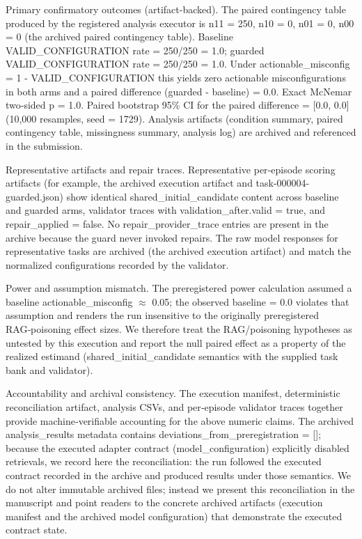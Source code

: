 \documentclass[conference]{IEEEtran}
\begin{document}
Primary confirmatory outcomes (artifact-backed). The paired contingency table produced by the registered analysis executor is n11 = 250, n10 = 0, n01 = 0, n00 = 0 (the archived paired contingency table). Baseline VALID\_CONFIGURATION rate = 250/250 = 1.0; guarded VALID\_CONFIGURATION rate = 250/250 = 1.0. Under actionable\_misconfig = 1 - VALID\_CONFIGURATION this yields zero actionable misconfigurations in both arms and a paired difference (guarded - baseline) = 0.0. Exact McNemar two‑sided p = 1.0. Paired bootstrap 95\% CI for the paired difference = [0.0, 0.0] (10,000 resamples, seed = 1729). Analysis artifacts (condition summary, paired contingency table, missingness summary, analysis log) are archived and referenced in the submission.

Representative artifacts and repair traces. Representative per‑episode scoring artifacts (for example, the archived execution artifact and task-000004-guarded.json) show identical shared\_initial\_candidate content across baseline and guarded arms, validator traces with validation\_after.valid = true, and repair\_applied = false. No repair\_provider\_trace entries are present in the archive because the guard never invoked repairs. The raw model responses for representative tasks are archived (the archived execution artifact) and match the normalized configurations recorded by the validator.

Power and assumption mismatch. The preregistered power calculation assumed a baseline actionable\_misconfig \ensuremath{\approx} 0.05; the observed baseline = 0.0 violates that assumption and renders the run insensitive to the originally preregistered RAG‑poisoning effect sizes. We therefore treat the RAG/poisoning hypotheses as untested by this execution and report the null paired effect as a property of the realized estimand (shared\_initial\_candidate semantics with the supplied task bank and validator).

Accountability and archival consistency. The execution manifest, deterministic reconciliation artifact, analysis CSVs, and per‑episode validator traces together provide machine‑verifiable accounting for the above numeric claims. The archived analysis\_results metadata contains deviations\_from\_preregistration = []; because the executed adapter contract (model\_configuration) explicitly disabled retrievals, we record here the reconciliation: the run followed the executed contract recorded in the archive and produced results under those semantics. We do not alter immutable archived files; instead we present this reconciliation in the manuscript and point readers to the concrete archived artifacts (execution manifest and the archived model configuration) that demonstrate the executed contract state.
\end{document}
